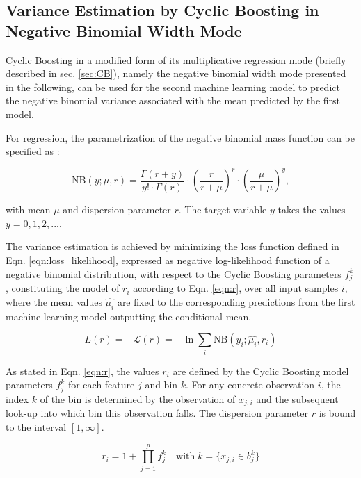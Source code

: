 \documentclass[BCOR=1mm, DIV=calc,10pt,
twoside=true,
twocolumn,
headings=normal]{scrartcl}
\newcommand{\eqn}{Eqn. }
\begin{document}
\subsection{Variance Estimation by Cyclic Boosting in Negative Binomial Width Mode}

Cyclic Boosting in a modified form of its multiplicative regression mode (briefly described in sec. \ref{sec:CB}), namely the negative binomial width mode presented in the following, can be used for the second machine learning model to predict the negative binomial variance associated with the mean predicted by the first model.

For regression, the parametrization of the negative binomial mass function can be specified as \cite{hilbe2011negative}:

\begin{equation} \label{eqn:nbinom}
\mathrm{NB}(y; \mu, r) = \frac{\Gamma(r + y)}{y! \cdot \Gamma(r)} \cdot \left(\frac{r}{r + \mu}\right)^r \cdot \left(\frac{\mu}{r + \mu}\right)^y,
\end{equation}

with mean $\mu$ and dispersion parameter $r$. The target variable $y$ takes the values $y = 0, 1, 2, ...$.

The variance estimation is achieved by minimizing the loss function defined in \eqn \eqref{eqn:loss_likelihood}, expressed as negative log-likelihood function of a negative binomial distribution, with respect to the Cyclic Boosting parameters $f^k_j$, constituting the model of $r_i$ according to  \eqn \eqref{eqn:r}, over all input samples $i$, where the mean values $\hat{\mu_i}$ are fixed to the corresponding predictions from the first machine learning model outputting the conditional mean.

\begin{equation} \label{eqn:loss_likelihood}
L(r) = -\mathcal{L}(r) = -\ln \sum_i \mathrm{NB}(y_i; \hat{\mu_i}, r_i)
\end{equation}

As stated in \eqn \eqref{eqn:r}, the values $r_i$ are defined by the Cyclic Boosting model parameters $f^k_j$ for each feature $j$ and bin $k$. For any concrete observation $i$, the index $k$ of the bin is determined by the observation of $x_{j,i}$ and the subsequent look-up into which bin this observation falls. The dispersion parameter $r$ is bound to the interval $[1, \infty]$.

\begin{equation} \label{eqn:r}
r_i = 1 + \prod \limits_{j=1}^p f^k_j \quad \text{with}\; k=\{ x_{j,i} \in b^k_j\}
\end{equation}
\end{document}
